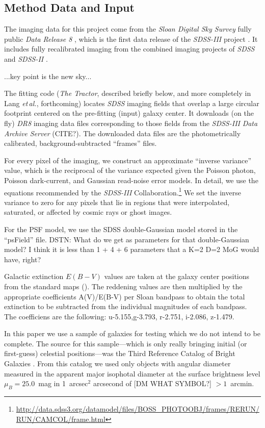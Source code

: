 \documentclass[12pt,preprint,pdftex]{aastex}
\newcommand{\project}[1]{\textsl{#1}}
\newcommand{\foreign}[1]{\emph{#1}}
\newcommand{\etal}{\foreign{et\,al.}}
\begin{document}
\subsection{Method Data and Input}\label{sec:data}
The imaging data for this project come from the \project{Sloan Digital
  Sky Survey} fully public \project{Data Release 8} \citep{dr8}, which is
the first data release of the \project{SDSS-III} project \citep{sdssiii}.  It
includes fully recalibrated imaging \citep{padmanabhan} from the
combined imaging projects of \project{SDSS} \citep{york}  and
\project{SDSS-II} \citep{sdssii}.

...key point is the new sky...

The fitting code (\project{The Tractor}, described briefly below, and
more completely in Lang \etal, forthcoming) locates \project{SDSS}
imaging fields that overlap a large circular footprint centered on the
pre-fitting (input) galaxy center.  It downloads (on the fly)
\project{DR8} imaging data files corresponding to those fields from
the \project{SDSS-III} \project{Data Archive Server} (CITE?).  The
downloaded data files are the photometrically calibrated,
background-subtracted ``frames'' files.

For every pixel of the imaging, we construct an approximate ``inverse
variance'' value, which is the reciprocal of the variance expected
given the Poisson photon, Poisson dark-current, and Gaussian
read-noise error models.  In detail, we use the equations recommended
by the \project{SDSS-III}
Collaboration.\footnote{\url{http://data.sdss3.org/datamodel/files/BOSS\_PHOTOOBJ/frames/RERUN/RUN/CAMCOL/frame.html}}
We set the inverse variance to zero for any pixels that lie in regions
that were interpolated, saturated, or affected by cosmic rays or ghost
images.

For the PSF model, we use the SDSS double-Gaussian model stored in the
``psField'' file.  DSTN: What do we get as parameters for that
double-Gaussian model?  I think it is less than 1 + 4 + 6 parameters
that a K=2 D=2 MoG would have, right?

Galactic extinction $E(B-V)$ values are taken at the galaxy center
positions from the standard maps (\citealt{schlegel98}).  The
reddening values are then multiplied by the appropriate coefficients
A(V)/E(B-V) per Sloan bandpass to obtain the total extinction to be
subtracted from the individual magnitudes of each bandpass. The
coefficiens are the following: u-5.155,g-3.793, r-2.751, i-2.086,
z-1.479.

In this paper we use a sample of galaxies for testing which we do not
intend to be complete.  The source for this sample---which is only
really bringing initial (or first-guess) celestial positions---was the
Third Reference Catalog of Bright Galaxies \citep{rc3}.  From this
catalog we used only objects with angular diameter measured in the
apparent major isophotal diameter at the surface brightness level
$\mu_B = 25.0$~mag in 1~arcsec$^2$ arcsecond of [DM WHAT SYMBOL?]
$>1$~arcmin.
\end{document}
